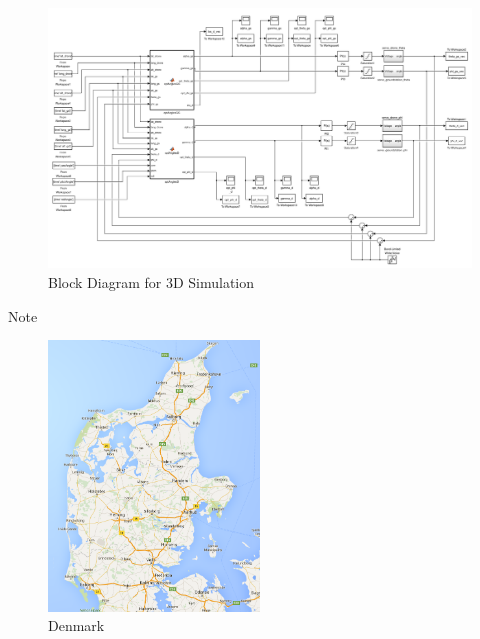 \begin{figure}
	\centering
	\includegraphics[width=1.1\textwidth,height=1.1\textheight,keepaspectratio]{figures/diagram_3D.png}
	\caption{Block Diagram for 3D Simulation}
   	\label{fig:diagram3D}
\end{figure}

Note 

\begin{figure}[h]
	\centering
	\includegraphics[width=0.5\textwidth]{figures/denmark.png}
	\caption{Denmark}
   	\label{fig:denmark}
\end{figure}

